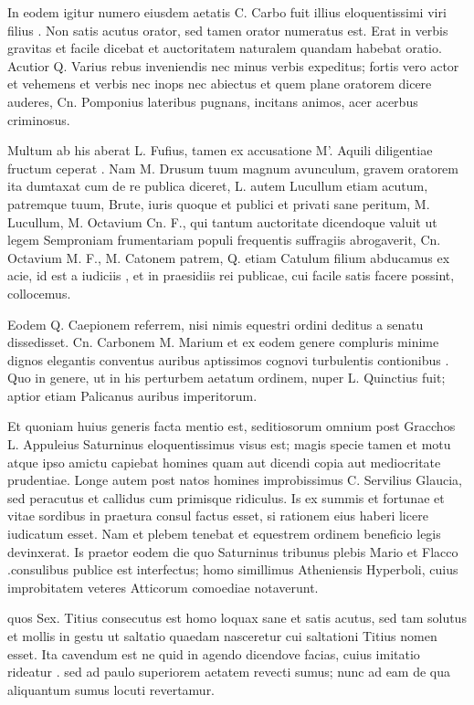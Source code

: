  In eodem igitur numero eiusdem aetatis C. Carbo fuit illius eloquentissimi viri filius . Non satis acutus orator, sed tamen orator numeratus est. Erat in verbis gravitas et facile dicebat et auctoritatem naturalem quandam habebat oratio. Acutior Q. Varius rebus inveniendis nec minus verbis expeditus; fortis vero actor et vehemens et verbis nec inops nec abiectus et quem plane oratorem dicere auderes, Cn. Pomponius lateribus pugnans, incitans animos, acer acerbus criminosus.

 Multum ab his aberat L. Fufius, tamen ex accusatione M'. Aquili diligentiae fructum ceperat . Nam M. Drusum tuum magnum avunculum, gravem oratorem ita dumtaxat cum de re publica diceret, L. autem Lucullum etiam acutum, patremque tuum, Brute, iuris quoque et publici et privati sane peritum, M. Lucullum, M. Octavium Cn. F., qui tantum auctoritate dicendoque valuit ut legem Semproniam frumentariam populi frequentis suffragiis abrogaverit, Cn. Octavium M. F., M. Catonem patrem, Q. etiam Catulum filium abducamus ex acie, id est a iudiciis , et in praesidiis rei publicae, cui facile satis facere possint, collocemus.

 Eodem Q. Caepionem referrem, nisi nimis equestri ordini deditus a senatu dissedisset. Cn. Carbonem M. Marium et ex eodem genere compluris minime dignos elegantis conventus auribus aptissimos cognovi turbulentis contionibus . Quo in genere, ut in his perturbem aetatum ordinem, nuper L. Quinctius fuit; aptior etiam Palicanus auribus imperitorum.

 Et quoniam huius generis facta mentio est, seditiosorum omnium post Gracchos L. Appuleius Saturninus eloquentissimus visus est; magis specie tamen et motu atque ipso amictu capiebat homines quam aut dicendi copia aut mediocritate prudentiae. Longe autem post natos homines improbissimus C. Servilius Glaucia, sed peracutus et callidus cum primisque ridiculus. Is ex summis et fortunae et vitae sordibus in praetura consul factus esset, si rationem eius haberi licere iudicatum esset. Nam et plebem tenebat et equestrem ordinem beneficio legis devinxerat. Is praetor eodem die quo Saturninus tribunus plebis Mario et Flacco .consulibus publice est interfectus; homo simillimus Atheniensis Hyperboli, cuius improbitatem veteres Atticorum comoediae notaverunt.

 quos Sex. Titius consecutus est homo loquax sane et satis acutus, sed tam solutus et mollis in gestu ut saltatio quaedam nasceretur cui saltationi Titius nomen esset. Ita cavendum est ne quid in agendo dicendove facias, cuius imitatio rideatur . sed ad paulo superiorem aetatem revecti sumus; nunc ad eam de qua aliquantum sumus locuti revertamur.

